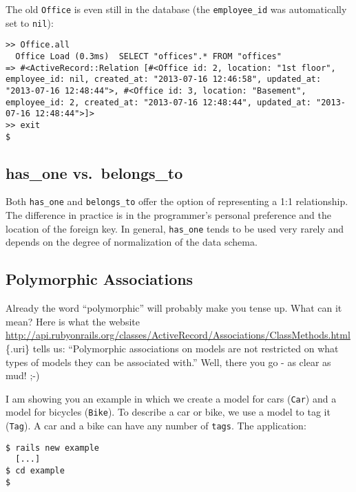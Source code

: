 \documentclass[a4paper]{book}
\newcounter{tab}[chapter]
\begin{document}
The old \texttt{Office} is even still in the database (the \texttt{employee\_id} was automatically set to \texttt{nil}):

\begin{shaded}\begin{verbatim}
>> Office.all
  Office Load (0.3ms)  SELECT "offices".* FROM "offices"
=> #<ActiveRecord::Relation [#<Office id: 2, location: "1st floor", employee_id: nil, created_at: "2013-07-16 12:46:58", updated_at: "2013-07-16 12:48:44">, #<Office id: 3, location: "Basement", employee_id: 2, created_at: "2013-07-16 12:48:44", updated_at: "2013-07-16 12:48:44">]>
>> exit
$
\end{verbatim}\end{shaded}

\subsection{has\_one vs.~belongs\_to}\label{hasux5fone-vs.belongsux5fto}

Both \texttt{has\_one} and \texttt{belongs\_to} offer the option of representing a 1:1 relationship. The difference in practice is in the programmer's personal preference and the location of the foreign key. In general, \texttt{has\_one} tends to be used very rarely and depends on the degree of normalization of the data schema.

\subsection{Polymorphic Associations}\label{polymorphic-associations}

Already the word “polymorphic” will probably make you tense up. What can it mean? Here is what the website \url{http://api.rubyonrails.org/classes/ActiveRecord/Associations/ClassMethods.html}\{.uri\} tells us: “Polymorphic associations on models are not restricted on what types of models they can be associated with.” Well, there you go - as clear as mud! ;-)

I am showing you an example in which we create a model for cars (\texttt{Car}) and a model for bicycles (\texttt{Bike}). To describe a car or bike, we use a model to tag it (\texttt{Tag}). A car and a bike can have any number of \texttt{tags}. The application:

\begin{shaded}\begin{verbatim}
$ rails new example
  [...]
$ cd example
$
\end{verbatim}\end{shaded}
\end{document}
